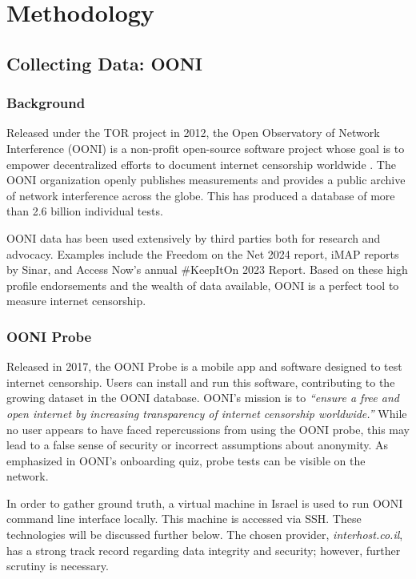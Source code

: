 \chapter{Methodology}

\section{Collecting Data: OONI}

\subsection{Background}
Released under the TOR project in 2012, the Open Observatory of Network Interference (OONI) is a non-profit open-source software project whose goal is to empower decentralized efforts to document internet censorship worldwide \cite{OONIAbout}. The OONI organization openly publishes measurements and provides a public archive of network interference across the globe. This has produced a database of more than 2.6 billion individual tests. \cite{OONIExplorer}

OONI data has been used extensively by third parties both for research and advocacy. Examples include the Freedom on the Net 2024 \cite{freedomhouse2024struggle} report, iMAP reports \cite{ooni2024imap} by Sinar, and Access Now’s annual \#KeepItOn 2023 Report. \cite{accessnow2023keepiton} \cite{ooni2024yearinreview} Based on these high profile endorsements and the wealth of data available, OONI is a perfect tool to measure internet censorship.

\subsection{OONI Probe}
Released in 2017, the OONI Probe is a mobile app and software designed to test internet censorship. Users can install and run this software, contributing to the growing dataset in the OONI database. OONI's mission is to \textit{“ensure a free and open internet by increasing transparency of internet censorship worldwide.”} While no user appears to have faced repercussions from using the OONI probe, this may lead to a false sense of security or incorrect assumptions about anonymity. As emphasized in OONI’s onboarding quiz, probe tests can be visible on the network.

In order to gather ground truth, a virtual machine in Israel is used to run OONI command line interface locally. This machine is accessed via SSH. These technologies will be discussed further below. The chosen provider, \textit{interhost.co.il}, has a strong track record regarding data integrity and security; however, further scrutiny is necessary. \cite{interhost} 


